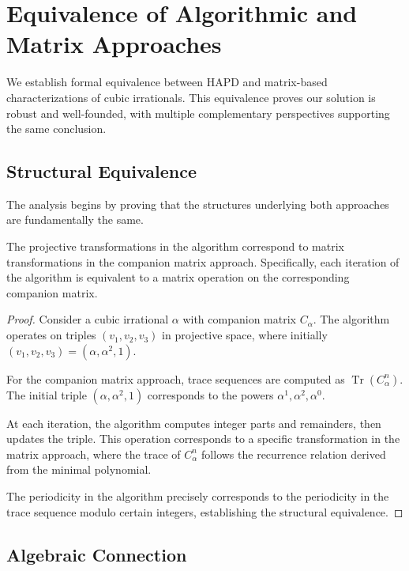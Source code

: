 \section{Equivalence of Algorithmic and Matrix Approaches}\label{sec:equivalence}

We establish formal equivalence between HAPD and matrix-based characterizations of cubic irrationals. This equivalence proves our solution is robust and well-founded, with multiple complementary perspectives supporting the same conclusion.

\subsection{Structural Equivalence}

The analysis begins by proving that the structures underlying both approaches are fundamentally the same.

\begin{theorem}
The projective transformations in the \HAPD{} algorithm correspond to matrix transformations in the companion matrix approach. Specifically, each iteration of the \HAPD{} algorithm is equivalent to a matrix operation on the corresponding companion matrix.
\end{theorem}

\begin{proof}
Consider a cubic irrational $\alpha$ with companion matrix $C_\alpha$. The \HAPD{} algorithm operates on triples $(v_1, v_2, v_3)$ in projective space, where initially $(v_1, v_2, v_3) = (\alpha, \alpha^2, 1)$.

For the companion matrix approach, trace sequences are computed as $\operatorname{Tr}(C_\alpha^n)$. The initial triple $(\alpha, \alpha^2, 1)$ corresponds to the powers $\alpha^1, \alpha^2, \alpha^0$.

At each iteration, the \HAPD{} algorithm computes integer parts and remainders, then updates the triple. This operation corresponds to a specific transformation in the matrix approach, where the trace of $C_\alpha^n$ follows the recurrence relation derived from the minimal polynomial.

The periodicity in the \HAPD{} algorithm precisely corresponds to the periodicity in the trace sequence modulo certain integers, establishing the structural equivalence.
\end{proof}

\subsection{Algebraic Connection}


